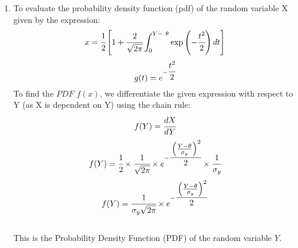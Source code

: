 \documentclass{article}
\begin{document}
\begin{enumerate}
\newpage
\item 
    To evaluate the probability density function (pdf) of the random variable X given by the expression:
    \[
        x = \cfrac{1}{2}\left[1 + \cfrac{2}{\sqrt{2\pi}}\int_{0}^{Y -\  \theta} \exp\left(-\cfrac{t^2}{2}\right) dt\right]
    \]
    \[
        g(t) = e^{-\cfrac{t^2}{2}}
    \]
    To find the \(PDF\) $f(x)$, we differentiate the given expression with respect to Y (as X is dependent on Y) using the chain rule:
    \[
        f(Y) = \cfrac{dX}{dY}
    \]
    \[
        f(Y) = \cfrac{1}{2}\times \cfrac{1}{\sqrt{2\pi}} \times e^{-\cfrac{\left(\frac{Y - \theta}{\sigma_y}\right)^2}{2}} \times \cfrac{1}{\sigma_y}
    \]
    \[
        f(Y) = \cfrac{1}{\sigma_y\sqrt{2\pi}} \times e^{-\cfrac{\left(\frac{Y - \theta}{\sigma_y}\right)^2}{2}}
    \]\\
    This is the Probability Density Function (PDF) of the random variable \(Y\).
    
\end{enumerate}
\end{document}
